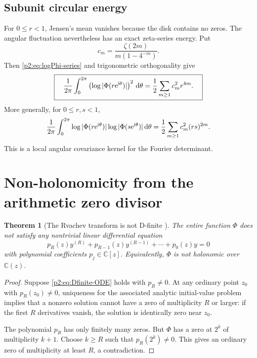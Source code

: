 \documentclass[11pt]{article}
\newtheorem{theorem}{Theorem}[section]
\theoremstyle{definition}
\theoremstyle{remark}
\newcommand{\C}{\mathbb C}
\newcommand{\dd}{\,\mathrm d}
\begin{document}
\subsection{Subunit circular energy}

For $0\le r<1$, Jensen's mean vanishes because the disk contains no zeros.  The angular
fluctuation nevertheless has an exact zeta-series energy.  Put
\begin{equation}
 c_m=\frac{\zeta(2m)}{m(1-4^{-m})}.                       \label{p2:eq:cm}
\end{equation}
Then \eqref{p2:eq:logPhi-series} and trigonometric orthogonality give
\begin{equation}
 \boxed{\quad
 \frac1{2\pi}\int_0^{2\pi}
 \left(\log|\Phi(r\e^{\ii\theta})|\right)^2\dd\theta
 =\frac12\sum_{m\ge1}c_m^2r^{4m}.
 \quad}                                                  \label{p2:eq:J-energy}
\end{equation}
More generally, for $0\le r,s<1$,
\begin{equation}
 \frac1{2\pi}\int_0^{2\pi}
 \log|\Phi(r\e^{\ii\theta})|
 \log|\Phi(s\e^{\ii\theta})|\dd\theta
 =\frac12\sum_{m\ge1}c_m^2(rs)^{2m}.                   \label{p2:eq:J-covariance}
\end{equation}
This is a local angular covariance kernel for the Fourier determinant.

\section{Non-holonomicity from the arithmetic zero divisor}
\label{p2:sec:nonDfinite}

\begin{theorem}[The Rvachev transform is not D-finite \New]
The entire function $\Phi$ does not satisfy any nontrivial linear differential equation
\begin{equation}
 p_R(z)y^{(R)}+p_{R-1}(z)y^{(R-1)}+\cdots+p_0(z)y=0       \label{p2:eq:Dfinite-ODE}
\end{equation}
with polynomial coefficients $p_j\in\C[z]$.  Equivalently, $\Phi$ is not holonomic over
$\C(z)$.
\end{theorem}

\begin{proof}
Suppose \eqref{p2:eq:Dfinite-ODE} holds with $p_R\ne0$.  At any ordinary point
$z_0$ with $p_R(z_0)\ne0$, uniqueness for the associated analytic initial-value problem
implies that a nonzero solution cannot have a zero of multiplicity $R$ or larger: if the
first $R$ derivatives vanish, the solution is identically zero near $z_0$.

The polynomial $p_R$ has only finitely many zeros.  But $\Phi$ has a zero at $2^k$ of
multiplicity $k+1$.  Choose $k\ge R$ such that $p_R(2^k)\ne0$.  This gives an ordinary zero
of multiplicity at least $R$, a contradiction.
\end{proof}
\end{document}
